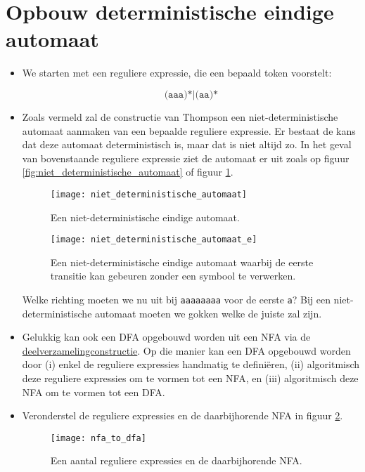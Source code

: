 \section{Opbouw deterministische eindige automaat}
\begin{itemize}
	\item We starten met een reguliere expressie, die een bepaald token voorstelt:
	
	$$\texttt{(aaa)*|(aa)*}$$
	
	\item Zoals vermeld zal de constructie van Thompson een niet-deterministische automaat aanmaken van een bepaalde reguliere expressie. Er bestaat de kans dat deze automaat deterministisch is, maar dat is niet altijd zo. In het geval van bovenstaande reguliere expressie ziet de automaat er uit zoals op figuur \ref{fig:niet_deterministische_automaat} of figuur \ref{fig:niet_deterministische_automaat_e}.
	\begin{figure}[h]
		\centering
		\begin{minipage}{0.7\textwidth}
			\texttt{[image: niet\_deterministische\_automaat]}
			\caption{Een niet-deterministische eindige automaat.}
			\label{fig:niet_deterministische_automaat}
		\end{minipage}
		\begin{minipage}{0.7\textwidth}
			\texttt{[image: niet\_deterministische\_automaat\_e]}
			\caption{Een niet-deterministische eindige automaat waarbij de eerste transitie kan gebeuren zonder een symbool te verwerken.}
			\label{fig:niet_deterministische_automaat_e}
		\end{minipage}
	\end{figure}

	Welke richting moeten we nu uit bij \texttt{aaaaaaaa} voor de eerste \texttt{a}? Bij een niet-deterministische automaat moeten we gokken welke de juiste zal zijn.
	
	\item Gelukkig kan ook een DFA opgebouwd worden uit een NFA via de \underline{deelverzamelingconstructie}. Op die manier kan een DFA opgebouwd worden door (i) enkel de reguliere expressies handmatig te definiëren, (ii) algoritmisch deze reguliere expressies om te vormen tot een NFA, en (iii) algoritmisch deze NFA om te vormen tot een DFA. 
	
	\item Veronderstel de reguliere expressies en de daarbijhorende NFA in figuur \ref{fig:nfa_to_dfa}.
	\begin{figure}[h]
		\texttt{[image: nfa\_to\_dfa]}
		\caption{Een aantal reguliere expressies en de daarbijhorende NFA.}
		\label{fig:nfa_to_dfa}
	\end{figure}


\end{itemize}
